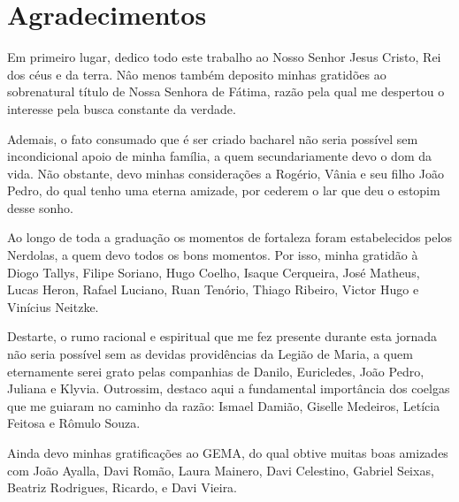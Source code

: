 \chapter*{Agradecimentos}


Em primeiro lugar, dedico todo este trabalho ao Nosso Senhor Jesus Cristo, Rei dos céus e da terra. Nâo menos também deposito minhas gratidões ao sobrenatural título de Nossa Senhora de Fátima, razão pela qual me despertou o interesse pela busca constante da verdade.

Ademais, o fato consumado que é ser criado bacharel não seria possível sem incondicional apoio de minha família, a quem secundariamente devo o dom da vida. Não obstante, devo minhas considerações a Rogério, Vânia e seu filho João Pedro, do qual tenho uma eterna amizade, por cederem o lar que deu o estopim desse sonho.

Ao longo de toda a graduação os momentos de fortaleza foram estabelecidos pelos Nerdolas, a quem devo todos os bons momentos. Por isso, minha gratidão à Diogo Tallys, Filipe Soriano, Hugo Coelho, Isaque Cerqueira, José Matheus, Lucas Heron, Rafael Luciano, Ruan Tenório, Thiago Ribeiro, Victor Hugo e Vinícius Neitzke. 

Destarte, o rumo racional e espiritual que me fez presente durante esta jornada não seria possível sem as devidas providências da Legião de Maria, a quem eternamente serei grato pelas companhias de Danilo, Euricledes, João Pedro, Juliana e Klyvia. Outrossim, destaco aqui a fundamental importância dos coelgas que me guiaram no caminho da razão: Ismael Damião, Giselle Medeiros, Letícia Feitosa e Rômulo Souza.

Ainda devo minhas gratificações ao GEMA, do qual obtive muitas boas amizades com João Ayalla, Davi Romão, Laura Mainero, Davi Celestino, Gabriel Seixas, Beatriz Rodrigues, Ricardo, e Davi Vieira.


\begin{minipage}{.45\linewidth}
\begin{flushleft}
\end{flushleft}
\end{minipage}
\begin{minipage}{.45\linewidth}
\end{minipage}